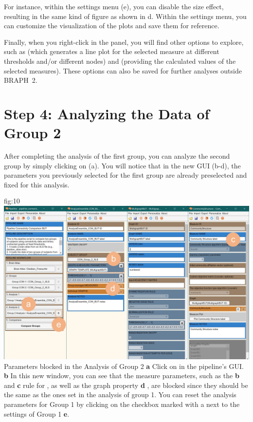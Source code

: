 \documentclass[justified]{tufte-handout}
\begin{document}
For instance, within the settings menu (e), you can disable the size effect, resulting in the same kind of figure as shown in d. Within the settings menu, you can customize the visualization of the plots and save them for reference.

Finally, when you right-click in the  panel, you will find other options to explore, such as  (which generates a line plot for the selected measure at different thresholds and/or different nodes) and  (providing the calculated values of the selected measures). These options can also be saved for further analyses outside BRAPH~2.

\section{Step 4: Analyzing the Data of Group 2}

After completing the analysis of the first group, you can analyze the second group by simply clicking on  (a). You will notice that in the new GUI (b-d), the parameters you previously selected for the first group are already preselected and fixed for this analysis. 

{fig:10}
{
	\includegraphics{fig10.jpg}
}
{Parameters blocked in the Analysis of Group 2}
{
	{\bf a} Click on  in the pipeline's GUI.
	{\bf b} In this new window, you can see that the measure parameters, such as the {\bf b}  and {\bf c} rule for , as well as the graph property {\bf d} , are blocked since they should be the same as the ones set in the analysis of group 1. You can reset the analysis parameters for Group 1 by clicking on the checkbox marked with a  next to the settings of Group 1 {\bf e}.
}
\end{document}
